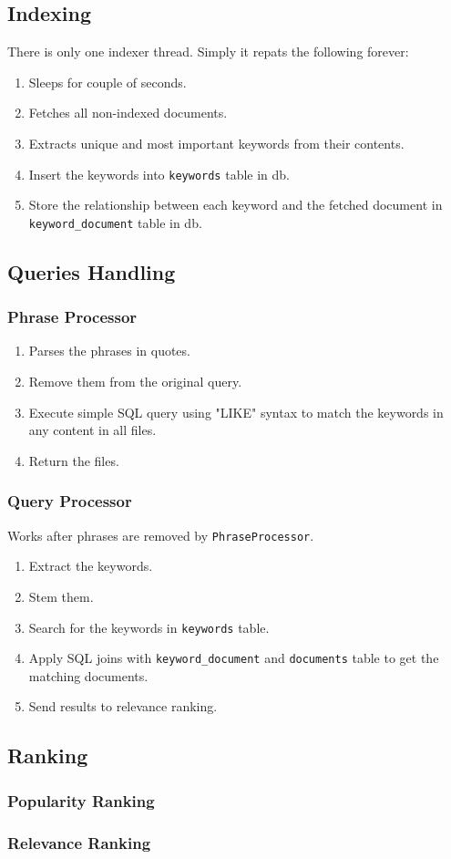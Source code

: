 \documentclass[12pt]{article}
\begin{document}
\subsection{Indexing}
There is only one indexer thread. 
Simply it repats the following forever:
\begin{enumerate}
  \item Sleeps for couple of seconds.
  \item Fetches all non-indexed documents.
  \item Extracts unique and most important keywords from their contents.
  \item Insert the keywords into \texttt{keywords} table in db.
  \item Store the relationship between each keyword and the fetched document in \texttt{keyword\_document} table in db.
\end{enumerate}

\subsection{Queries Handling}
\subsubsection{Phrase Processor}
\begin{enumerate}
  \item Parses the phrases in quotes.
  \item Remove them from the original query.
  \item Execute simple SQL query using "LIKE" syntax to match the keywords in any content in all files.
  \item Return the files.
\end{enumerate}

\subsubsection{Query Processor}
Works after phrases are removed by \texttt{PhraseProcessor}.
\begin{enumerate}
  \item Extract the keywords.
  \item Stem them.
  \item Search for the keywords in \texttt{keywords} table.
  \item Apply SQL joins with \texttt{keyword\_document} and \texttt{documents} table to get the matching documents.
  \item Send results to relevance ranking.
\end{enumerate}

\subsection{Ranking}
\subsubsection{Popularity Ranking}
\subsubsection{Relevance Ranking}
\end{document}
